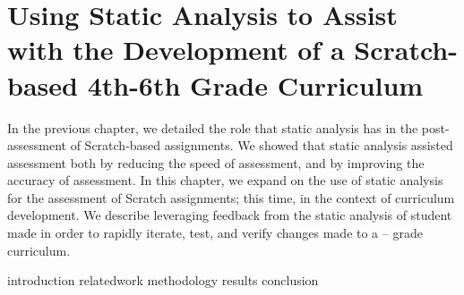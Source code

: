 \chapter{Using Static Analysis to Assist with the Development of a
  Scratch-based 4th-6th Grade Curriculum}
\label{chap:curriculum}

\def\currentprefix{curriculum}

In the previous chapter, we detailed the role that static analysis has in the
post-assessment of Scratch-based assignments. We showed that static analysis
assisted assessment both by reducing the speed of assessment, and by improving
the accuracy of assessment. In this chapter, we expand on the use of static
analysis for the assessment of Scratch assignments; this time, in the context
of curriculum development. We describe leveraging feedback from the static
analysis of student made  in order to rapidly iterate, test, and
verify changes made to a  --  grade curriculum.

{introduction}
{relatedwork}
{methodology}
{results}
{conclusion}
